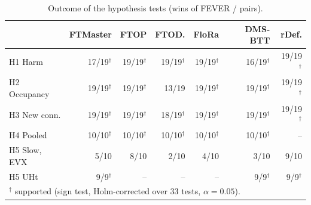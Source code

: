 \begin{table}[t]
\centering
\caption{Outcome of the hypothesis tests (wins of FEVER / pairs).}
\label{tab:tests}
\footnotesize
\setlength{\tabcolsep}{2.6pt}
\begin{tabular}{lrrrrrr}
\toprule
 & FTMaster & FTOP & FTOD. & FloRa & DMS-BTT & rDef. \\
\midrule
H1 Harm & 17/19$^\dagger$ & 19/19$^\dagger$ & 19/19$^\dagger$ & 19/19$^\dagger$ & 16/19$^\dagger$ & 19/19$^\dagger$ \\
H2 Occupancy & 19/19$^\dagger$ & 19/19$^\dagger$ & 13/19 & 19/19$^\dagger$ & 19/19$^\dagger$ & 19/19$^\dagger$ \\
H3 New conn. & 19/19$^\dagger$ & 19/19$^\dagger$ & 18/19$^\dagger$ & 19/19$^\dagger$ & 19/19$^\dagger$ & 19/19$^\dagger$ \\
H4 Pooled & 10/10$^\dagger$ & 10/10$^\dagger$ & 10/10$^\dagger$ & 10/10$^\dagger$ & 10/10$^\dagger$ & -- \\
H5 Slow, EVX & 5/10 & 8/10 & 2/10 & 4/10 & 3/10 & 9/10 \\
H5 UHt & 9/9$^\dagger$ & -- & -- & -- & 9/9$^\dagger$ & 9/9$^\dagger$ \\
\bottomrule
\multicolumn{7}{l}{$^\dagger$ supported (sign test, Holm-corrected over 33 tests, $\alpha = 0.05$).}
\end{tabular}
\end{table}
